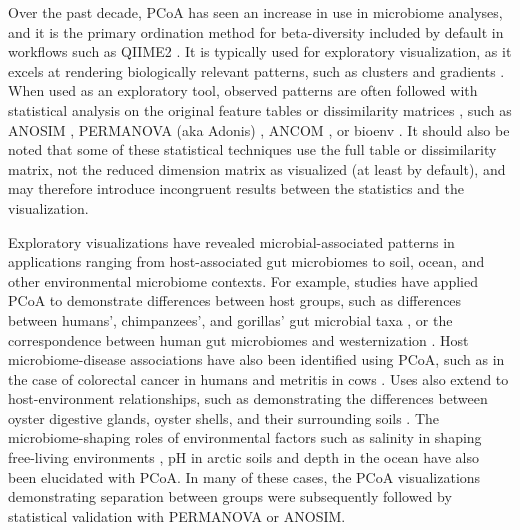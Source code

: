 Over the past decade, PCoA has seen an increase in use in microbiome analyses, and it is the primary ordination method for beta-diversity included by default in workflows such as QIIME2 \cite{Bolyen2019-fq}. It is typically used for exploratory visualization, as it excels at rendering biologically relevant patterns, such as clusters and gradients \cite{Kuczynski2010-gu}. When used as an exploratory tool, observed patterns are often followed with statistical analysis on the original feature tables or dissimilarity matrices \cite{Galloway-Pena2020-fg}, such as ANOSIM \cite{Clarke1993-ad}, PERMANOVA (aka Adonis) \cite{Anderson2017-og}, ANCOM \cite{Mandal2015-pm}, or bioenv \cite{Clarke1993-ad}. It should also be noted that some of these statistical techniques use the full table or dissimilarity matrix, not the reduced dimension matrix as visualized (at least by default), and may therefore introduce incongruent results between the statistics and the visualization.

Exploratory visualizations have revealed microbial-associated patterns in applications ranging from host-associated gut microbiomes to soil, ocean, and other environmental microbiome contexts. For example, studies have applied PCoA to demonstrate differences between host groups, such as differences between humans', chimpanzees', and gorillas' gut microbial taxa \cite{Campbell2020-hj}, or the correspondence between human gut microbiomes and westernization \cite{Campbell2020-hj,Yatsunenko2012-wv}. Host microbiome-disease associations have also been identified using PCoA, such as in the case of colorectal cancer \cite{Young2021-ho} in humans and metritis in cows \cite{noauthor_2019-us}. Uses also extend to host-environment relationships, such as demonstrating the differences between oyster digestive glands, oyster shells, and their surrounding soils \cite{Arfken2017-hy}. The microbiome-shaping roles of environmental factors such as salinity in shaping free-living environments \cite{Lozupone2007-yr}, pH in arctic soils \cite{Malard2019-rk} and depth in the ocean \cite{Sunagawa2015-gg} have also been elucidated with PCoA. In many of these cases, the PCoA visualizations demonstrating separation between groups were subsequently followed by statistical validation with PERMANOVA or ANOSIM.

